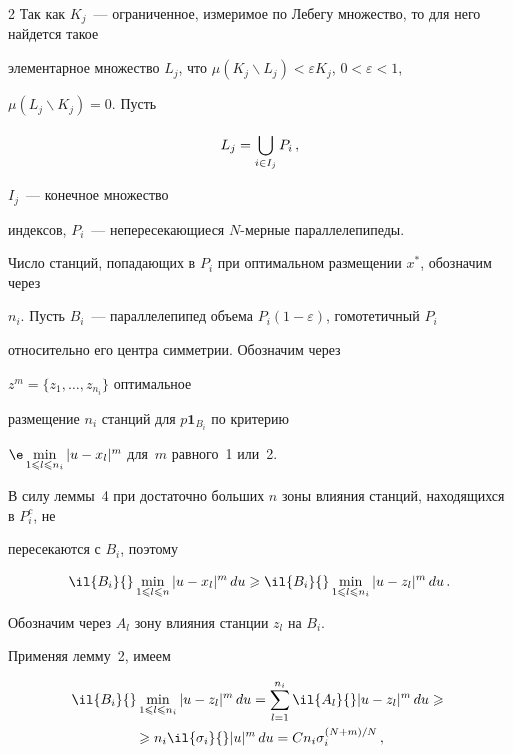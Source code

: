 \begin{multicols}{2}
Так как $K_j$~--- ограниченное, измеримое по Лебегу множество, то для него найдется такое


элементарное множество $L_j$, что $\mu(K_j\backslash L_j)<\varepsilon K_j$, $0<\varepsilon <1$,


$\mu(L_j\backslash K_j)=0$.  Пусть


$$


L_j=\cupl{i\in I_j}{}P_i\,,


$$


$I_j$~--- конечное множество


индексов, $P_i$~--- непересекающиеся $N$-мерные параллелепипеды.





Число станций, попадающих в $P_i$ при оптимальном размещении $x^*$, обозначим через


$n_i$. Пусть $B_i$~--- параллелепипед объема $P_i(1-\varepsilon)$, гомотетичный $P_i$


относительно его центра симметрии. Обозначим через


$z^m=\{z_1,\dots,z_{n_i}\}$ оптимальное


размещение $n_i$ станций для $p \textbf{1}_{B_i}$ по критерию


${\e}\minl{1\leqslant l\leqslant n_i}|u-x_l|^m$ для~$m$ равного~1 или~2.





В силу леммы~4 при достаточно больших $n$ зоны влияния станций, находящихся в $P_i^c$, не


пересекаются с $B_i$, поэтому


$$


\il{B_i}{}\minl{1\leqslant l\leqslant n}|u-x_l|^m\,du \geqslant \il{B_i}{}\minl{1\leqslant l\leqslant n_i}|u-z_l|^m\,du\,.


$$


Обозначим через $A_l$ зону влияния станции $z_l$ на $B_i$.


Применяя лемму~2, имеем


\begin{multline*}


\il{B_i}{}\minl{1\leqslant l\leqslant n_i}|u-z_l|^m\,du


=\suml{l=1}{n_i}\il{A_l}{}|u-z_l|^m\,du \geqslant {}\\


{}\geqslant


n_i \il{\sigma_i}{}|u|^m\,du=C n_i \sigma_i^{(N+m)/N}\,,



\end{multline*}
\end{multicols}
